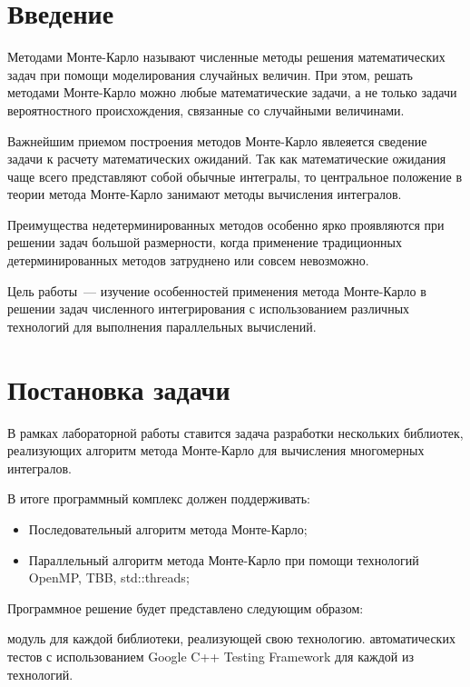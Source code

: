\documentclass{report}
\begin{document}
\setcounter{page}{2}

\tableofcontents
\newpage

\section*{Введение}
Методами Монте-Карло называют численные методы решения математических задач при помощи моделирования случайных величин. При этом, решать методами Монте-Карло можно любые математические задачи, а не только задачи вероятностного происхождения, связанные со случайными величинами.
\par Важнейшим приемом построения методов Монте-Карло явлеяется сведение задачи к расчету математических ожиданий. Так как математические ожидания чаще всего представляют собой обычные интегралы, то центральное положение в теории метода Монте-Карло занимают методы вычисления интегралов.
\par Преимущества недетерминированных методов особенно ярко проявляются при решении задач большой размерности, когда применение традиционных детерминированных методов затруднено или совсем невозможно. 
\par Цель работы~--- изучение особенностей применения метода Монте-Карло в решении задач численного интегрирования с использованием различных технологий для выполнения параллельных вычислений.
\newpage

\section*{Постановка задачи}
В рамках лабораторной работы ставится задача разработки нескольких библиотек, реализующих алгоритм метода Монте-Карло для вычисления многомерных интегралов.
\par В итоге программный комплекс должен поддерживать:
\begin{itemize}
\item Последовательный алгоритм метода Монте-Карло;
\item Параллельный алгоритм метода Монте-Карло при помощи технологий OpenMP, TBB, std::threads;
\end{itemize}
\par Программное решение будет представлено следующим образом:
\begin{enumerate} 
 модуль для каждой библиотеки, реализующей свою технологию.
 автоматических тестов с использованием Google C++ Testing Framework для каждой из технологий.
\end{enumerate} 
\end{document}
